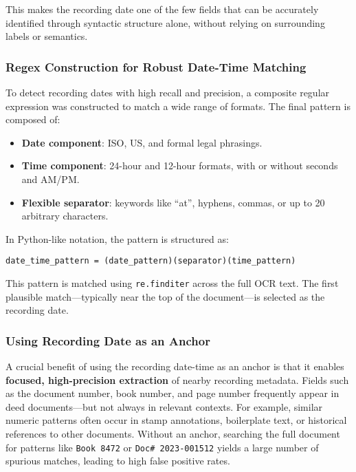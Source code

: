 \documentclass{article}
\begin{document}
This makes the recording date one of the few fields that can be accurately identified through syntactic structure alone, without relying on surrounding labels or semantics.

\subsubsection{Regex Construction for Robust Date-Time Matching}

To detect recording dates with high recall and precision, a composite regular expression was constructed to match a wide range of formats. The final pattern is composed of:

\begin{itemize}
    \item \textbf{Date component}: ISO, US, and formal legal phrasings.
    \item \textbf{Time component}: 24-hour and 12-hour formats, with or without seconds and AM/PM.
    \item \textbf{Flexible separator}: keywords like ``at'', hyphens, commas, or up to 20 arbitrary characters.
\end{itemize}

In Python-like notation, the pattern is structured as:

\texttt{date\_time\_pattern = (date\_pattern)(separator)(time\_pattern)}

This pattern is matched using \texttt{re.finditer} across the full OCR text. The first plausible match—typically near the top of the document—is selected as the recording date.

\subsubsection{Using Recording Date as an Anchor}

A crucial benefit of using the recording date-time as an anchor is that it enables \textbf{focused, high-precision extraction} of nearby recording metadata. Fields such as the document number, book number, and page number frequently appear in deed documents—but not always in relevant contexts. For example, similar numeric patterns often occur in stamp annotations, boilerplate text, or historical references to other documents. Without an anchor, searching the full document for patterns like \texttt{Book 8472} or \texttt{Doc\# 2023-001512} yields a large number of spurious matches, leading to high false positive rates. \\
\end{document}
